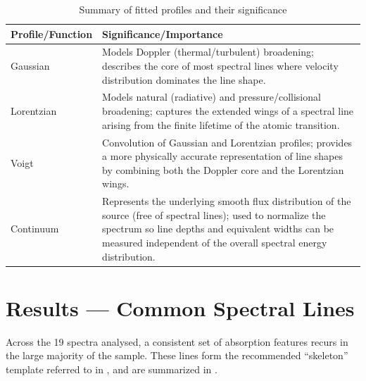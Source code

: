 \documentclass[12pt]{article}
\begin{document}
\begin{table}[h]
\centering
\caption{Summary of fitted profiles and their significance}
\label{tab:profiles}
\begin{tabular}{p{5cm} p{9cm}}
\hline
\textbf{Profile/Function} & \textbf{Significance/Importance} \\
\hline
Gaussian &
Models Doppler (thermal/turbulent) broadening; describes the core of most spectral lines where velocity distribution dominates the line shape. \\
\hline
Lorentzian &
Models natural (radiative) and pressure/collisional broadening; captures the extended wings of a spectral line arising from the finite lifetime of the atomic transition. \\
\hline
Voigt &
Convolution of Gaussian and Lorentzian profiles; provides a more physically accurate representation of line shapes by combining both the Doppler core and the Lorentzian wings. \\
\hline
Continuum &
Represents the underlying smooth flux distribution of the source (free of spectral lines); used to normalize the spectrum so line depths and equivalent widths can be measured independent of the overall spectral energy distribution. \\
\hline
\end{tabular}
\end{table}

 

\section{Results --- Common Spectral Lines}
\label{sec:results}
 
Across the 19 spectra analysed, a consistent set of absorption features recurs in the large majority of the sample. These lines form the recommended ``skeleton'' template referred to in , and are summarized in .
 
\end{document}
